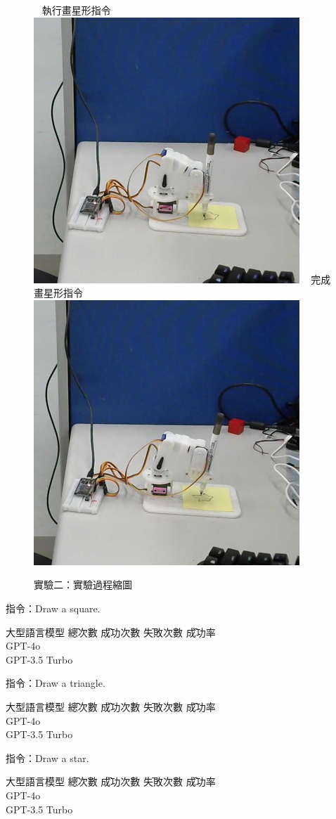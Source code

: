\documentclass[class=NCU_thesis, crop=false]{standalone}
\begin{document}
\begin{figure}[!hbt]
    ~    
    \subcaptionbox
        {執行畫星形指令
        \label{fig:fig-dataset-contrast-after-adjustment}}
        {\includegraphics[width=0.4\linewidth]{figures/star_0.jpg}}
    ~
    \subcaptionbox
        {完成畫星形指令
        \label{fig:fig-dataset-contrast-after-adjustment}}
        {\includegraphics[width=0.4\linewidth]{figures/star_1.jpg}}   
\caption{實驗二：實驗過程縮圖}
\end{figure}

指令：Draw a square.
\begin{tabbing}
    大型語言模型 \= 總次數 \= 成功次數 \= 失敗次數 \= 成功率 \\
    GPT-4o   \\
    GPT-3.5 Turbo    \\
\end{tabbing}

指令：Draw a triangle.
\begin{tabbing}
    大型語言模型 \= 總次數 \= 成功次數 \= 失敗次數 \= 成功率 \\
    GPT-4o   \\
    GPT-3.5 Turbo    \\
\end{tabbing}

指令：Draw a star.
\begin{tabbing}
    大型語言模型 \= 總次數 \= 成功次數 \= 失敗次數 \= 成功率 \\
    GPT-4o   \\
    GPT-3.5 Turbo    \\
\end{tabbing}
\end{document}
